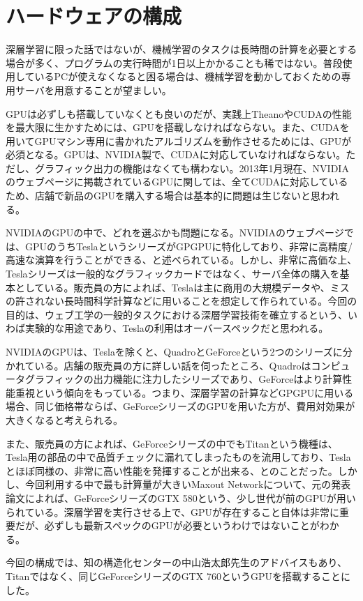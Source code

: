 \section{ハードウェアの構成}
深層学習に限った話ではないが、機械学習のタスクは長時間の計算を必要とする場合が多く、プログラムの実行時間が1日以上かかることも稀ではない。普段使用しているPCが使えなくなると困る場合は、機械学習を動かしておくための専用サーバを用意することが望ましい。\par
GPUは必ずしも搭載していなくとも良いのだが、実践上TheanoやCUDAの性能を最大限に生かすためには、GPUを搭載しなければならない。また、CUDAを用いてGPUマシン専用に書かれたアルゴリズムを動作させるためには、GPUが必須となる。GPUは、NVIDIA製で、CUDAに対応していなければならない。ただし、グラフィック出力の機能はなくても構わない。2013年1月現在、NVIDIAのウェブページに掲載されているGPUに関しては、全てCUDAに対応しているため、店舗で新品のGPUを購入する場合は基本的に問題は生じないと思われる。\par
NVIDIAのGPUの中で、どれを選ぶかも問題になる。NVIDIAのウェブページでは、GPUのうちTeslaというシリーズがGPGPUに特化しており、非常に高精度/高速な演算を行うことができる、と述べられている。しかし、非常に高価な上、Teslaシリーズは一般的なグラフィックカードではなく、サーバ全体の購入を基本としている。販売員の方によれば、Teslaは主に商用の大規模データや、ミスの許されない長時間科学計算などに用いることを想定して作られている。今回の目的は、ウェブ工学の一般的タスクにおける深層学習技術を確立するという、いわば実験的な用途であり、Teslaの利用はオーバースペックだと思われる。\par
NVIDIAのGPUは、Teslaを除くと、QuadroとGeForceという2つのシリーズに分かれている。店舗の販売員の方に詳しい話を伺ったところ、Quadroはコンピュータグラフィックの出力機能に注力したシリーズであり、GeForceはより計算性能重視という傾向をもっている。つまり、深層学習の計算などGPGPUに用いる場合、同じ価格帯ならば、GeForceシリーズのGPUを用いた方が、費用対効果が大きくなると考えられる。\par
また、販売員の方によれば、GeForceシリーズの中でもTitanという機種は、Tesla用の部品の中で品質チェックに漏れてしまったものを流用しており、Teslaとほぼ同様の、非常に高い性能を発揮することが出来る、とのことだった。しかし、今回利用する中で最も計算量が大きいMaxout Networkについて、元の発表論文によれば、GeForceシリーズのGTX 580という、少し世代が前のGPUが用いられている。深層学習を実行させる上で、GPUが存在すること自体は非常に重要だが、必ずしも最新スペックのGPUが必要というわけではないことがわかる。\par
今回の構成では、知の構造化センターの中山浩太郎先生のアドバイスもあり、Titanではなく、同じGeForceシリーズのGTX 760というGPUを搭載することにした。
